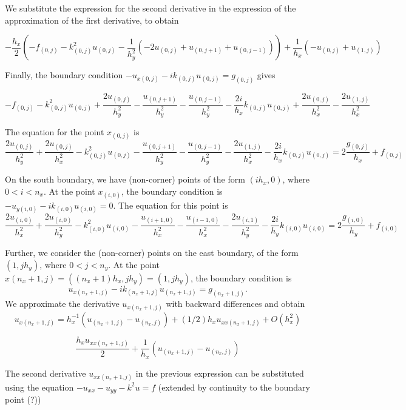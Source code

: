 \documentclass[a4paper, landscape, 11pt]{article}
\begin{document}
    We substitute the expression for the second derivative in the expression
of the approximation of the first derivative, to obtain

    \[- \frac{h_{x}}{2} \left(- f_{(0,j)} - k_{(0,j)}^{2} u_{(0,j)} - \frac{1}{h_{y}^{2}} \left(- 2 u_{(0,j)} + u_{(0,j+1)} + u_{(0,j-1)}\right)\right) + \frac{1}{h_{x}} \left(- u_{(0,j)} + u_{(1,j)}\right)\]


    Finally, the boundary condition
\(-u_{x(0,j)}-ik_{(0,j)}u_{(0,j)}=g_{(0,j)}\) gives

    
\[- f_{(0,j)} - k_{(0,j)}^{2} u_{(0,j)} + \frac{2 u_{(0,j)}}{h_{y}^{2}} - \frac{u_{(0,j+1)}}{h_{y}^{2}} - \frac{u_{(0,j-1)}}{h_{y}^{2}} - \frac{2 i}{h_{x}} k_{(0,j)} u_{(0,j)} + \frac{2 u_{(0,j)}}{h_{x}^{2}} - \frac{2 u_{(1,j)}}{h_{x}^{2}}\]

    

    The equation for the point \(x_{(0,j)}\) is
\[  \frac{2 u_{(0,j)}}{h_{y}^{2}}  + \frac{2 u_{(0,j)}}{h_{x}^{2}} - k_{(0,j)}^{2} u_{(0,j)} - \frac{u_{(0,j+1)}}{h_{y}^{2}} - \frac{u_{(0,j-1)}}{h_{y}^{2}}  - \frac{2 u_{(1,j)}}{h_{x}^{2}} - \frac{2 i}{h_{x}} k_{(0,j)} u_{(0,j)}  = 2\frac{g_{(0,j)}}{h_x}+ f_{(0,j)}\]

    On the south boundary, we have (non-corner) points of the form
\((ih_x,0)\), where \(0<i<n_x\). At the point \(x_{(i,0)}\), the
boundary condition is \(−u_{y(i,0)}−ik_{(i,0)}u_{(i,0)}=0\). The
equation for this point is
\[  \frac{2 u_{(i,0)}}{h_{x}^{2}}  + \frac{2 u_{(i,0)}}{h_{y}^{2}} - k_{(i,0)}^{2} u_{(i,0)} - \frac{u_{(i+1,0)}}{h_{x}^{2}} - \frac{u_{(i-1,0)}}{h_{x}^{2}}  - \frac{2 u_{(i,1)}}{h_{y}^{2}} - \frac{2 i}{h_{y}} k_{(i,0)} u_{(i,0)}  = 2\frac{g_{(i,0)}}{h_y}+ f_{(i,0)}\]

    Further, we consider the (non-corner) points on the east boundary, of
the form \((1,jh_y)\), where \(0<j<n_y\). At the point
\(x{(n_x+1,j)}=((n_x+1)h_x,jh_y)=(1,jh_y)\), the boundary condition is
\[u_{x(n_x+1,j)}−ik_{(n_x+1,j)}u_{(n_x+1,j)}=g_{(n_x+1,j)}.\] We
approximate the derivative \(u_{x(n_x+1,j)}\) with backward differences
and obtain
\[u_{x(n_x+1,j)}=h_x^{-1}(u_{(n_x+1,j)}-u_{(n_x,j)})+(1/2)h_xu_{xx(n_x+1,j)}+O(h_x^2)\]
    
\[\frac{h_{x} u_{xx(n_x+1,j)}}{2} + \frac{1}{h_{x}} \left(u_{(n_x+1,j)} - u_{(n_x,j)}\right)\]

    
The second derivative \(u_{xx(n_x+1,j)}\) in the previous expression can
be substituted using the equation \(-u_{xx}-u_{yy}-k^2u=f\) (extended by
continuity to the boundary point (?))
\end{document}
